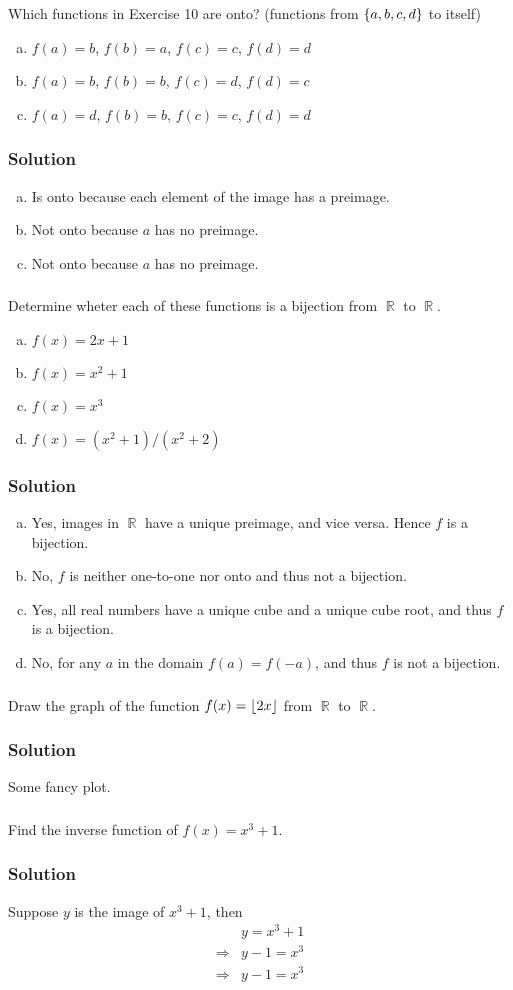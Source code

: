 \documentclass[11pt,a4paper,multicol]{article}
\newcommand{\problem}[1]{%
\setcounter{subsubsection}{#1}%
\addtocounter{subsubsection}{-1}%
\subsubsection{\hfill}%
}
\newenvironment{subproblem}
	{\begin{enumerate}[a)]}
	{\end{enumerate}}
\newcommand{\solution}{%
\subsubsection*{Solution}%
}
\DeclarePairedDelimiter{\floor}{\lfloor}{\rfloor}
\DeclarePairedDelimiter{\set}
	{\lbrace}
	{\rbrace}
\DeclareMathOperator{\RR}{\mathbb{R}}
\begin{document}
		\problem{11}
			Which functions in Exercise 10 are onto? (functions from $\set{a, b, c, d}$ to itself)
			\begin{subproblem}
				\item $f(a) = b$,
					$f(b) = a$,
					$f(c) = c$,
					$f(d) = d$
				\item $f(a) = b$,
					$f(b) = b$,
					$f(c) = d$,
					$f(d) = c$
				\item $f(a) = d$,
					$f(b) = b$,
					$f(c) = c$,
					$f(d) = d$
			\end{subproblem}
		\solution
			\begin{subproblem}
				\item Is onto because each element of the image has a preimage.
				\item Not onto because $a$ has no preimage.
				\item Not onto because $a$ has no preimage.
			\end{subproblem}

		\problem{23}
			Determine wheter each of these functions is a bijection from $\RR$ to $\RR$.
			\begin{subproblem}
				\item $f(x) = 2x + 1$
				\item $f(x) = x^2 + 1$
				\item $f(x) = x^3$
				\item $f(x) = (x^2 + 1)/(x^2 + 2)$
			\end{subproblem}
		\solution
			\begin{subproblem}
				\item Yes, images in $\RR$ have a unique preimage, and vice versa. Hence $f$ is a bijection.
				\item No, $f$ is neither one-to-one nor onto and thus not a bijection.
				\item Yes, all real numbers have a unique cube and a unique cube root, and thus $f$ is a bijection.
				\item No, for any $a$ in the domain $f(a) = f(-a)$, and thus $f$ is not a bijection.
			\end{subproblem}

		\problem{63}
			Draw the graph of the function $f(x) = \floor{2x}$ from $\RR$ to $\RR$.
		\solution
			Some fancy plot.

		\problem{69}
			Find the inverse function of $f(x) = x^3 + 1$.
		\solution
			Suppose $y$ is the image of $x^3 + 1$, then
			\begin{align*}
			   			    & y = x^3 + 1 \\
				\Rightarrow & y - 1 = x^3 \\
				\Rightarrow & y - 1 = x^3
			\end{align*}
\end{document}
